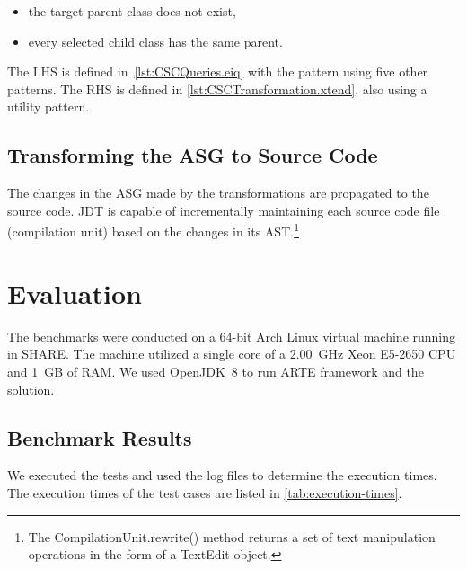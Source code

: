 \documentclass[submission,copyright,creativecommons]{eptcs}
\begin{document}
\begin{itemize}[noitemsep]
	\item the target parent class does not exist,
	\item every selected child class has the same parent.
\end{itemize}

The LHS is defined in~\autoref{lst:CSCQueries.eiq} with the  pattern using five other patterns. The RHS is defined in \autoref{lst:CSCTransformation.xtend}, also using a utility pattern.

\subsection[Transforming the ASG to Source Code]{Transforming the ASG to Source Code\qquad{}}

The changes in the ASG made by the transformations are propagated to the source code. JDT is capable of incrementally maintaining each source code file (compilation unit) based on the changes in its AST.\footnote{The \textsf{CompilationUnit.rewrite()} method returns a set of text manipulation operations in the form of a \textsf{TextEdit} object.}

\section{Evaluation}

The benchmarks were conducted on a 64-bit Arch Linux virtual machine running in SHARE. The machine utilized a single core of a 2.00~GHz Xeon E5-2650 CPU and 1~GB of RAM. We used OpenJDK~8 to run ARTE framework and the solution.

\subsection{Benchmark Results}

We executed the tests and used the log files to determine the execution times. The execution times of the test cases are listed in \autoref{tab:execution-times}. 
\end{document}

